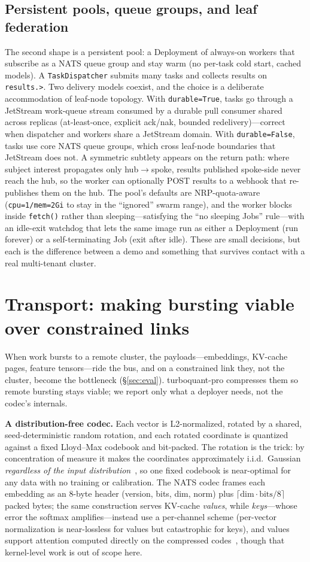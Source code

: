 \documentclass[conference]{IEEEtran}
\begin{document}
\subsection{Persistent pools, queue groups, and leaf federation}
The second shape is a persistent pool: a Deployment of always-on workers that subscribe as a NATS
queue group and stay warm (no per-task cold start, cached models). A \texttt{TaskDispatcher}
submits many tasks and collects results on \texttt{results.\textgreater}. Two delivery models
coexist, and the choice is a deliberate accommodation of leaf-node topology. With
\texttt{durable=True}, tasks go through a JetStream work-queue stream consumed by a durable pull
consumer shared across replicas (at-least-once, explicit ack/nak, bounded redelivery)---correct
when dispatcher and workers share a JetStream domain. With \texttt{durable=False}, tasks use core
NATS queue groups, which cross leaf-node boundaries that JetStream does not. A symmetric subtlety
appears on the return path: where subject interest propagates only hub$\to$spoke, results
published spoke-side never reach the hub, so the worker can optionally POST results to a webhook
that re-publishes them on the hub. The pool's defaults are NRP-quota-aware
(\texttt{cpu=1/mem=2Gi} to stay in the ``ignored'' swarm range), and the worker blocks inside
\texttt{fetch()} rather than sleeping---satisfying the ``no sleeping Jobs'' rule---with an
idle-exit watchdog that lets the same image run as either a Deployment (run forever) or a
self-terminating Job (exit after idle). These are small decisions, but each is the difference
between a demo and something that survives contact with a real multi-tenant cluster.

\section{Transport: making bursting viable over constrained links}\label{sec:tq}
When work bursts to a remote cluster, the payloads---embeddings, KV-cache pages, feature
tensors---ride the bus, and on a constrained link they, not the cluster, become the bottleneck
(\S\ref{sec:eval}). turboquant-pro compresses them so remote bursting stays viable; we report only
what a deployer needs, not the codec's internals.

\textbf{A distribution-free codec.} Each vector is L2-normalized, rotated by a shared,
seed-deterministic random rotation, and each rotated coordinate is quantized against a fixed
Lloyd--Max codebook and bit-packed. The rotation is the trick: by concentration of measure it
makes the coordinates approximately i.i.d.\ Gaussian \emph{regardless of the input
distribution}~\cite{turboquant}, so one fixed codebook is near-optimal for any data with no
training or calibration. The NATS codec frames each embedding as an 8-byte header (version, bits,
dim, norm) plus $\lceil\text{dim}\cdot\text{bits}/8\rceil$ packed bytes; the same construction
serves KV-cache \emph{values}, while \emph{keys}---whose error the softmax amplifies---instead use a
per-channel scheme (per-vector normalization is near-lossless for values but catastrophic for keys),
and values support attention computed directly on the compressed
codes~\cite{onlinesoftmax,flashattention}, though that kernel-level work is out of scope here.
\end{document}
